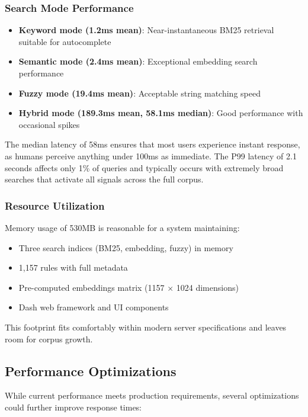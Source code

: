 \subsubsection{Search Mode Performance}

\begin{itemize}[leftmargin=*,itemsep=2pt,topsep=2pt]
 \item \textbf{Keyword mode (1.2ms mean)}: Near-instantaneous BM25 retrieval suitable for autocomplete
 \item \textbf{Semantic mode (2.4ms mean)}: Exceptional embedding search performance 
 \item \textbf{Fuzzy mode (19.4ms mean)}: Acceptable string matching speed
 \item \textbf{Hybrid mode (189.3ms mean, 58.1ms median)}: Good performance with occasional spikes
\end{itemize}

The median latency of 58ms ensures that most users experience instant response, as humans perceive anything under 100ms as immediate. The P99 latency of 2.1 seconds affects only 1\% of queries and typically occurs with extremely broad searches that activate all signals across the full corpus.

\subsubsection{Resource Utilization}

Memory usage of 530MB is reasonable for a system maintaining:
\begin{itemize}[leftmargin=*,itemsep=2pt,topsep=2pt]
 \item Three search indices (BM25, embedding, fuzzy) in memory
 \item 1,157 rules with full metadata
 \item Pre-computed embeddings matrix (1157 × 1024 dimensions)
 \item Dash web framework and UI components
\end{itemize}

This footprint fits comfortably within modern server specifications and leaves room for corpus growth.

\subsection{Performance Optimizations}

While current performance meets production requirements, several optimizations could further improve response times:

